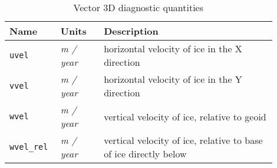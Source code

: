 \begin{table}[ht]
  \centering
  \begin{tabular}{p{0.15\linewidth}p{0.15\linewidth}p{0.6\linewidth}}
    \toprule
    \textbf{Name} & \textbf{Units} & \textbf{Description} \\
    \midrule
    \texttt{uvel} & \textsl{m / year} &  horizontal velocity of ice in the X direction \\
    \texttt{vvel} & \textsl{m / year} &  horizontal velocity of ice in the Y direction \\
    \texttt{wvel} & \textsl{m / year} &  vertical velocity of ice, relative to geoid \\
    \texttt{wvel_rel} & \textsl{m / year} &  vertical velocity of ice, relative to base of ice directly below \\
    \bottomrule
  \end{tabular}
\caption{Vector 3D diagnostic quantities}
\label{tab:three-d-diagnostics-vector}
\end{table}

